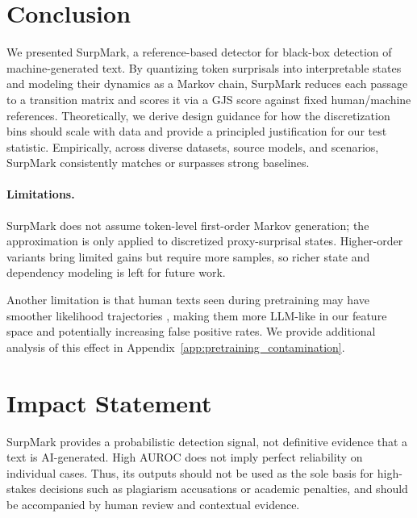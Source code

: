 \documentclass{article}
\theoremstyle{plain}
\theoremstyle{definition}
\theoremstyle{remark}
\begin{document}
\section{Conclusion}
\vspace{-2mm}
We presented SurpMark, a reference-based detector for black-box detection
of machine-generated text. By quantizing token surprisals into interpretable states and modeling their dynamics as a Markov chain, SurpMark reduces each passage to a transition matrix and scores it via a GJS score against fixed human/machine references. Theoretically, we derive design guidance for how the discretization bins should scale with data and provide a principled justification for our test statistic. Empirically, across diverse datasets, source models, and scenarios, SurpMark consistently matches or surpasses strong baselines.
\vspace{-2mm}
\paragraph{Limitations.}
SurpMark does not assume token-level first-order Markov generation; the approximation is only applied to discretized proxy-surprisal states. 
Higher-order variants bring limited gains but require more samples, so richer state and dependency modeling is left for future work. 

Another limitation is that human texts seen during pretraining may have smoother likelihood trajectories \cite{shi2024detecting}, making them more LLM-like in our feature space and potentially increasing false positive rates. 
We provide additional analysis of this effect in Appendix~\ref{app:pretraining_contamination}.


\section*{Impact Statement}
SurpMark provides a probabilistic detection signal, not definitive evidence that a text is AI-generated. 
High AUROC does not imply perfect reliability on individual cases. 
Thus, its outputs should not be used as the sole basis for high-stakes decisions such as plagiarism accusations or academic penalties, and should be accompanied by human review and contextual evidence.
\end{document}
